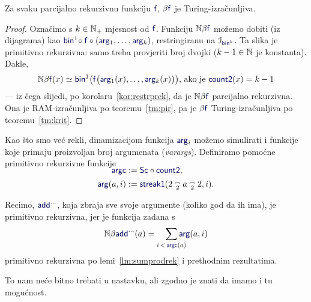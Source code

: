 

\begin{teorem}[{name=[Turing-izračunljivost parcijalno rekurzivnih brojevnih funkcija]}]\label{tm:pibt}
Za svaku parcijalno rekurzivnu funkciju $\f f$, $\beta\f f$ je Turing-izračunljiva.
\end{teorem}
\begin{proof}
Označimo s $k\in{\mathbb N}_+$ mjesnost od $\f f$. %
    Funkciju $\N\beta\f f$ možemo dobiti (iz dijagrama) kao $\f{bin}^1\!\circ\f f\circ(\f{arg}_1,\dotsc,\f{arg}_k)$, restringiranu na $\im{\f{bin}^k}$. Ta slika je primitivno rekurzivna: samo treba provjeriti broj dvojki ($k-1\in{\mathbb N}$ je konstanta).
Dakle,
\begin{equation}
\label{eq:defNbetaf}
    \N\beta\f f(x)\simeq\f{bin}^1\bigl(\f f\bigl(\f{arg}_1(x),\dotsc,\f{arg}_k(x)\bigr)\bigr)\text{, ako je }\f{count2}(x)=k-1
\end{equation}
--- iz čega slijedi, po korolaru~\ref{kor:restrprek}, da je $\N\beta\f f$ parcijalno rekurzivna. Ona je RAM-izračunljiva po teoremu~\ref{tm:pir},  pa je $\beta\f f$ Turing-iz\-rač\-un\-lji\-va po teoremu~\ref{tm:krit}.
\end{proof}

Kao što smo već rekli, dinamizacijom funkcija $\f{arg}_i$ možemo simulirati i funkcije koje primaju proizvoljan broj argumenata (\emph{varargs}). Definiramo pomoćne primitivno rekurzivne funkcije
\begin{align}
\SwapAboveDisplaySkip
\f{argc}&:=\f{Sc}\circ\f{count2}\text,\\
\f{arg}(a,i)&:=\f{streak1}(2\conc2a\conc22,i)\text.
\end{align}

\begin{primjer}[{name=[implementacija \emph{varargs} pomoću binarnog kodiranja]}]
Recimo, $\f{add}^{\cdots}$, koja zbraja sve svoje argumente (koliko god da ih ima), je primitivno rekurzivna, jer je funkcija zadana s
\begin{equation}
\N\beta\f{add}^{\cdots}(a)=\quad\sum_{\mathclap{i\,<\,\f{argc}(a)}}\f{arg}(a,i)
\end{equation}
primitivno rekurzivna po lemi~\ref{lm:sumprodrek} i prethodnim rezultatima.
\end{primjer}
To nam neće bitno trebati u nastavku, ali zgodno je znati da imamo i tu mogućnost.
